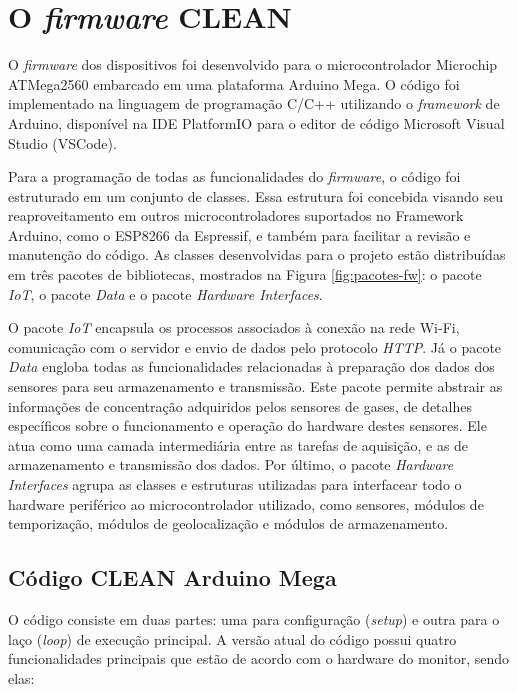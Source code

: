 \chapter{O \textit{firmware} CLEAN}\label{appendix: firmware}

O \textit{firmware} dos dispositivos foi desenvolvido para o microcontrolador Microchip ATMega2560 embarcado em uma plataforma Arduino Mega. O código foi implementado na linguagem de programação C/C++ utilizando o \textit{framework} de Arduino, disponível na IDE PlatformIO para o editor de código Microsoft Visual Studio (VSCode).

Para a programação de todas as funcionalidades do \textit{firmware}, o código foi estruturado em um conjunto de classes. Essa estrutura foi concebida visando seu reaproveitamento em outros microcontroladores suportados no Framework Arduino, como o ESP8266 da Espressif, e também para facilitar a revisão e manutenção do código. As classes desenvolvidas para o projeto estão distribuídas em três pacotes de bibliotecas, mostrados na Figura \ref{fig:pacotes-fw}: o pacote \textit{IoT}, o pacote \textit{Data} e o pacote \textit{Hardware Interfaces}.

O pacote \textit{IoT} encapsula os processos associados à conexão na rede Wi-Fi, comunicação com o servidor e envio de dados pelo protocolo \textit{HTTP}. Já o pacote \textit{Data} engloba todas as funcionalidades relacionadas à preparação dos dados dos sensores para seu armazenamento e transmissão. Este pacote permite abstrair as informações de concentração adquiridos pelos sensores de gases, de detalhes específicos sobre o funcionamento e operação do hardware destes sensores. Ele atua como uma camada intermediária entre as tarefas de aquisição, e as de armazenamento e transmissão dos dados. Por último, o pacote \textit{Hardware Interfaces} agrupa as classes e estruturas utilizadas para interfacear todo o hardware periférico ao microcontrolador utilizado, como sensores, módulos de temporização, módulos de geolocalização e módulos de armazenamento.

\section{Código CLEAN Arduino Mega}

O código consiste em duas partes: uma para configuração (\textit{setup}) e outra para o laço (\textit{loop}) de execução principal. A versão atual do código possui quatro funcionalidades principais que estão de acordo com o hardware do monitor, sendo elas:

